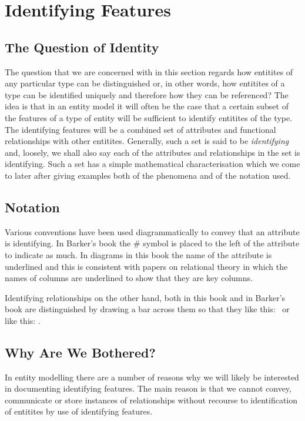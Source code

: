 \section{Identifying Features}
\label{IdentifyingFeatures}
\subsection{The Question of Identity}
The question that we are concerned with in this section regards how entitites of any particular type can be distinguished or, in other words, how entitites of a type can be identified uniquely and therefore how they can be referenced? 
The idea is that in an entity model it will often be the case that a certain subset of the features of a type of entity will be sufficient to identify entitites of the type. The identifying features will be a combined set of attributes and functional relationships with other entitites. Generally, such a set is said to be \textit{identifying}
and, loosely, we shall also say each of the attributes and relationships in the set is identifying. Such a set has a simple mathematical characterisation which we come to later after giving examples both of the phenomena and of the notation used. 

\subsection{Notation}
 \mynote
Various conventions have been used diagrammatically to convey that an attribute is identifying. In Barker's book the \# symbol is placed to the left of the attribute to indicate as much. In diagrams in this book the name of the attribute is underlined and this is consistent with papers on relational theory in which  the names of columns are underlined to show that they are key columns.

\mynote Identifying relationships on the other hand, both in this book and in Barker's book 
are distinguished by drawing a bar across them so that they like this: \barkerEllisJ\ or like this: \barkerEllisK.

\subsection{Why Are We Bothered?}
\mynote
In entity modelling there are a number of reasons why we will likely be
interested in documenting identifying features. The main reason is that we cannot convey, communicate or store instances of relationships without recourse to identification of entitites by use of identifying features. 

